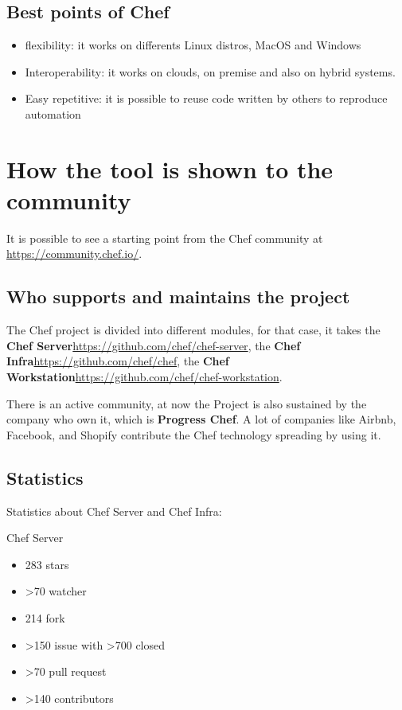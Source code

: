 \documentclass[12pt,a4paper,openright,twoside]{book}
\begin{document}
\subsection{Best points of Chef}

\begin{itemize}
\item{flexibility}: it works on differents Linux distros, MacOS and Windows
\item{Interoperability}: it works on clouds, on premise and also on hybrid systems.
\item{Easy repetitive}: it is possible to reuse code written by others to reproduce automation
\end{itemize}

\section{How the tool is shown to the community}
It is possible to see a starting point from the Chef community at \url{https://community.chef.io/}.

\subsection{Who supports and maintains the project}
The Chef project is divided into different modules, for that case, it takes the \textbf{Chef Server}\url{https://github.com/chef/chef-server},
the \textbf{Chef Infra}\url{https://github.com/chef/chef}, the \textbf{Chef Workstation}\url{https://github.com/chef/chef-workstation}.

There is an active community, at now the Project is also sustained by the company who own it, which is \textbf{Progress Chef}.
A lot of companies like Airbnb, Facebook, and Shopify contribute the Chef technology spreading by using it.

\subsection{Statistics}
Statistics about Chef Server and Chef Infra:


Chef Server


\begin{itemize}
    \item 283 stars
    \item >70 watcher
    \item 214 fork
    \item >150 issue with >700 closed
    \item >70 pull request
    \item >140 contributors
\end{itemize}
\end{document}
